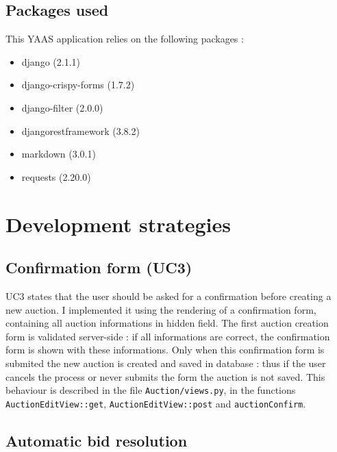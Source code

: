 \documentclass[a4paper, 11pt]{report}
\begin{document}
    \section{Packages used}
    This YAAS application relies on the following packages :
    \begin{itemize}
        \item django (2.1.1)
        \item django-crispy-forms (1.7.2)
        \item django-filter (2.0.0) 
        \item djangorestframework (3.8.2)
        \item markdown (3.0.1)
        \item requests (2.20.0)
        
    \end{itemize}

\chapter{Development strategies}

    \section{Confirmation form (UC3)}

    UC3 states that the user should be asked for a confirmation before creating a new auction. I implemented it using the rendering of a confirmation form, containing all auction informations in hidden field. The first auction creation form is validated server-side : if all informations are correct, the confirmation form is shown with these informations. Only when this confirmation form is submited the new auction is created and saved in database : thus if the user cancels the process or never submits the form the auction is not saved. This behaviour is described in the file \texttt{Auction/views.py}, in the functions \texttt{AuctionEditView::get}, \texttt{AuctionEditView::post} and \texttt{auctionConfirm}. 

    \section{Automatic bid resolution}
\end{document}
